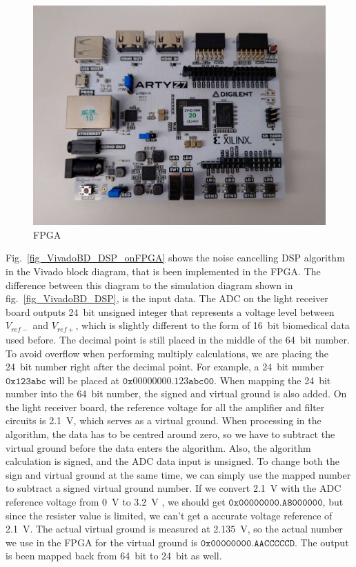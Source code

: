 \begin{figure}[h]
\centering
\includegraphics[width=1\linewidth]{4-ANC_Sys/FPGA.jpg}
\caption{FPGA}
\label{fig_FPGA}
\end{figure}

Fig.~\ref{fig_VivadoBD_DSP_onFPGA} shows the noise cancelling DSP algorithm in the Vivado block diagram, that is been implemented in the FPGA.  The difference between this diagram to the simulation diagram shown in fig.~\ref{fig_VivadoBD_DSP}, is the input data.  The ADC on the light receiver board outputs \qty{24}{bit} unsigned integer that represents a voltage level between $V_{ref-}$ and $V_{ref+}$, which is slightly different to the form of \qty{16}{bit} biomedical data used before.  The decimal point is still placed in the middle of the \qty{64}{bit} number.  To avoid overflow when performing multiply calculations, we are placing the \qty{24}{bit} number right after the decimal point.  For example, a \qty{24}{bit} number $\mathtt{0x123abc}$ will be placed at $\mathtt{0x00000000.123abc00}$.  When mapping the \qty{24}{bit} number into the \qty{64}{bit} number, the signed and virtual ground is also added.  On the light receiver board, the reference voltage for all the amplifier and filter circuits is \qty{2.1}{V}, which serves as a virtual ground.  When processing in the algorithm, the data has to be centred around zero, so we have to subtract the virtual ground before the data enters the algorithm.  Also, the algorithm calculation is signed, and the ADC data input is unsigned.  To change both the sign and virtual ground at the same time, we can simply use the mapped number to subtract a signed virtual ground number. 
 If we convert \qty{2.1}{V} with the ADC reference voltage from \qty{0}{V} to \qty{3.2}{V} , we should get $\mathtt{0x00000000.A8000000}$, but since the resister value is limited, we can't get a accurate voltage reference of \qty{2.1}{V}.  The actual virtual ground is measured at \qty{2.135}{V}, so the actual number we use in the FPGA for the virtual ground is $\mathtt{0x00000000.AACCCCCD}$.  The output is been mapped back from \qty{64}{bit} to \qty{24}{bit} as well.

